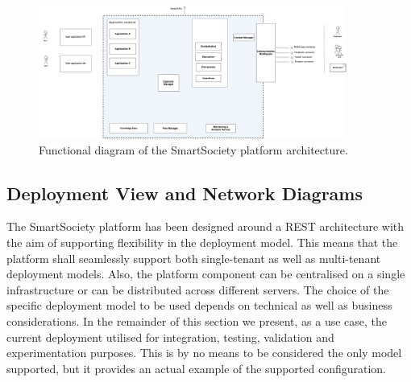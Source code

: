 \begin{figure}
\centering
\includegraphics[width=0.9\textwidth]{./figs/functional_diagram}
\caption{Functional diagram of the SmartSociety platform
architecture.}
\label{fig:functional}
\end{figure}

\subsection{Deployment View and Network Diagrams}
The SmartSociety platform has been designed around a REST architecture
with the aim of supporting flexibility in the deployment model. This
means that the platform shall seamlessly support both single-tenant as
well as multi-tenant deployment models. Also, the platform component
can be centralised on a single infrastructure or can be distributed
across different servers. The choice of the specific deployment model
to be used depends on technical as well as business considerations. In
the remainder of this section we present, as a use case, the current
deployment utilised for integration, testing, validation and
experimentation purposes. This is by no means to be considered the
only model supported, but it provides an actual example of the
supported configuration. 

